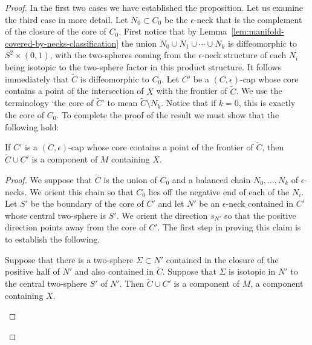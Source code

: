 \begin{proof}
In the first two cases we have established the proposition. Let us
examine the third case in more detail. Let $N_0\subset C_0$ be the
$\epsilon$-neck that is the complement of the closure of the core of
$C_0$.
 First notice that by
Lemma~\ref{lem:manifold-covered-by-necks-classification} the union $N_0\cup N_1\cup\cdots\cup N_k$ is
diffeomorphic to $S^2\times (0,1)$, with the two-spheres coming from
the $\epsilon$-neck structure of each $N_i$ being isotopic to the
two-sphere factor in this product structure. It follows immediately
that $\widetilde C$ is diffeomorphic to $C_0$. Let $C'$ be a
$(C,\epsilon)$-cap whose core contains a point of the intersection
of $X$ with the frontier of $\widetilde C$. We use the terminology
`the core of $\widetilde C$' to mean $\widetilde C\setminus N_k$.
Notice that if $k=0$, this is exactly the core of $C_0$. To complete
the proof of the result we must show that the following hold:

\begin{claim}
\label{claim:cap-union-is-component}
\label{cccomponent}
If $C'$ is a $(C,\epsilon)$-cap whose core contains a point of the
frontier of $\widetilde C$, then $\widetilde C\cup C'$ is a
component of $M$ containing $X$.
\end{claim}

\begin{proof}
We suppose that $\widetilde C$ is the union of $C_0$ and a balanced
chain $N_0,\ldots,N_k$ of $\epsilon$-necks. We orient this chain so
that $C_0$ lies off the negative end of each of the $N_i$.
 Let $S'$ be the boundary of the core of $C'$ and let $N'$ be an
$\epsilon$-neck contained in $C'$ whose central two-sphere is $S'$.
We orient the direction $s_{N'}$ so that the positive direction
points away from the core of  $C'$. The first step in proving this
claim is to establish the following.


\begin{claim}
\label{claim:isotopic-sphere-gives-component}
\label{sinside}
Suppose that there is a two-sphere $\Sigma\subset N'$ contained in
the closure of the positive half of $N'$ and also contained in
$\widetilde C$. Suppose that $\Sigma$ is isotopic in $N'$ to the
central two-sphere $S'$ of $N'$. Then $\widetilde C\cup C'$ is a
component of $M$, a component containing $X$.
\end{claim}



\end{proof}
\end{proof}
